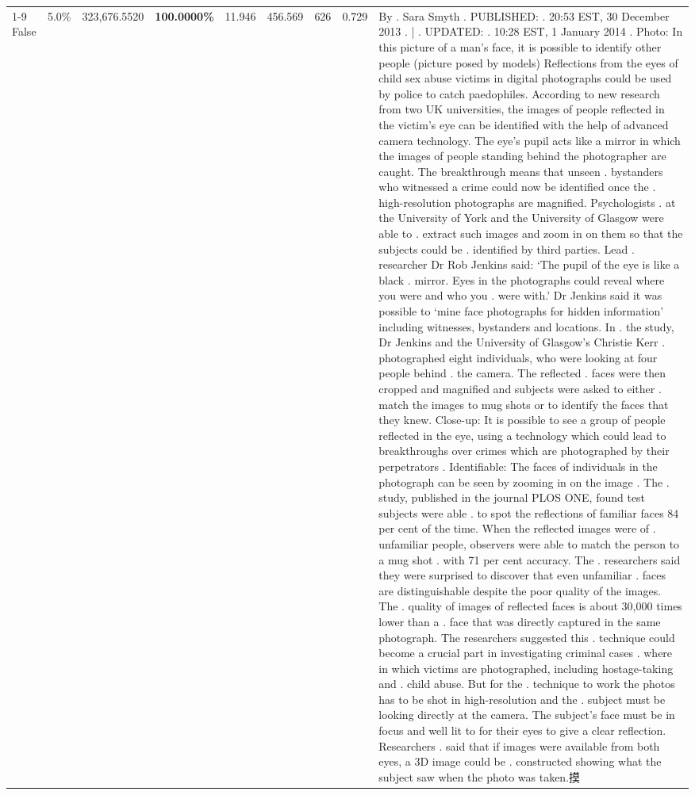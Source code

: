 \begin{table}[H]
\begin{tabular}{lllrlllll}
\cline{1-9}
False & 5.0\% & 323,676.5520 & \bfseries \color{red} 100.0000\% & 11.946 & 456.569 & 626 & 0.729 & By . Sara Smyth . PUBLISHED: . 20:53 EST, 30 December 2013 . | . UPDATED: . 10:28 EST, 1 January 2014 . Photo: In this picture of a man's face, it is possible to identify other people (picture posed by models) Reflections from the eyes of child sex abuse victims in digital photographs could be used by police to catch paedophiles. According to new research from two UK universities, the images of people reflected in the victim's eye can be identified with the help of advanced camera technology. The eye's pupil acts like a mirror in which the images of people standing behind the photographer are caught. The breakthrough means that unseen . bystanders who witnessed a crime could now be identified once the . high-resolution photographs are magnified. Psychologists . at the University of York and the University of Glasgow were able to . extract such images and zoom in on them so that the subjects could be . identified by third parties. Lead . researcher Dr Rob Jenkins said: ‘The pupil of the eye is like a black . mirror. Eyes in the photographs could reveal where you were and who you . were with.' Dr Jenkins said it was possible to ‘mine face photographs for hidden information' including witnesses, bystanders and locations. In . the study, Dr Jenkins and the University of Glasgow's Christie Kerr . photographed eight individuals, who were looking at four people behind . the camera. The reflected . faces were then cropped and magnified and subjects were asked to either . match the images to mug shots or to identify the faces that they knew. Close-up: It is possible to see a group of people reflected in the eye, using a technology which could lead to breakthroughs over crimes which are photographed by their perpetrators . Identifiable: The faces of individuals in the photograph can be seen by zooming in on the image . The . study, published in the journal PLOS ONE, found test subjects were able . to spot the reflections of familiar faces 84 per cent of the time. When the reflected images were of . unfamiliar people, observers were able to match the person to a mug shot . with 71 per cent accuracy. The . researchers said they were surprised to discover that even unfamiliar . faces are distinguishable despite the poor quality of the images. The . quality of images of reflected faces is about 30,000 times lower than a . face that was directly captured in the same photograph. The researchers suggested this . technique could become a crucial part in investigating criminal cases . where in which victims are photographed, including hostage-taking and . child abuse. But for the . technique to work the photos has to be shot in high-resolution and the . subject must be looking directly at the camera. The subject's face must be in focus and well lit to for their eyes to give a clear reflection. Researchers . said that if images were available from both eyes, a 3D image could be . constructed showing what the subject saw when the photo was taken.摸 \\

\end{tabular}
\end{table}
